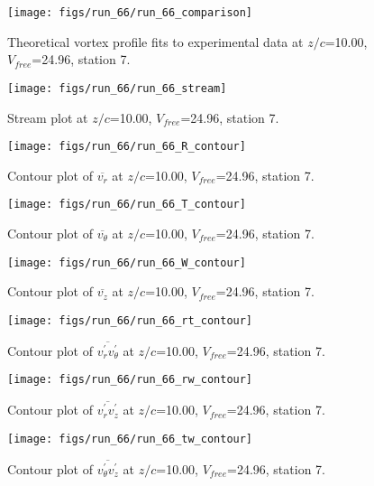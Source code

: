\begin{figure}[H]
\centering
\texttt{[image: figs/run\_66/run\_66\_comparison]}
\caption{Theoretical vortex profile fits to experimental data at $z/c$=10.00, $V_{free}$=24.96, station 7.}
\end{figure}


\begin{figure}[H]
\centering
\texttt{[image: figs/run\_66/run\_66\_stream]}
\caption{Stream plot at $z/c$=10.00, $V_{free}$=24.96, station 7.}
\end{figure}


\begin{figure}[H]
\centering
\texttt{[image: figs/run\_66/run\_66\_R\_contour]}
\caption{Contour plot of $\overline{v_{r}}$ at $z/c$=10.00, $V_{free}$=24.96, station 7.}
\end{figure}


\begin{figure}[H]
\centering
\texttt{[image: figs/run\_66/run\_66\_T\_contour]}
\caption{Contour plot of $\overline{v_{\theta}}$ at $z/c$=10.00, $V_{free}$=24.96, station 7.}
\end{figure}


\begin{figure}[H]
\centering
\texttt{[image: figs/run\_66/run\_66\_W\_contour]}
\caption{Contour plot of $\overline{v_{z}}$ at $z/c$=10.00, $V_{free}$=24.96, station 7.}
\end{figure}


\begin{figure}[H]
\centering
\texttt{[image: figs/run\_66/run\_66\_rt\_contour]}
\caption{Contour plot of $\overline{v_{r}^{\prime} v_{\theta}^{\prime}}$ at $z/c$=10.00, $V_{free}$=24.96, station 7.}
\end{figure}


\begin{figure}[H]
\centering
\texttt{[image: figs/run\_66/run\_66\_rw\_contour]}
\caption{Contour plot of $\overline{v_{r}^{\prime} v_{z}^{\prime}}$ at $z/c$=10.00, $V_{free}$=24.96, station 7.}
\end{figure}


\begin{figure}[H]
\centering
\texttt{[image: figs/run\_66/run\_66\_tw\_contour]}
\caption{Contour plot of $\overline{v_{\theta}^{\prime} v_{z}^{\prime}}$ at $z/c$=10.00, $V_{free}$=24.96, station 7.}
\end{figure}


